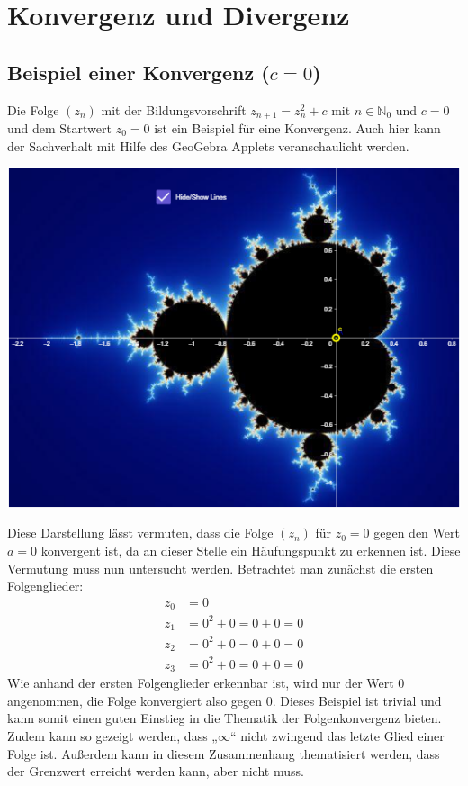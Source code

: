 \documentclass[a4paper, 12pt]{book}
\begin{document}
\sloppy

\chapter{Konvergenz und Divergenz}

\section{Beispiel einer Konvergenz ($c=0$)}

Die Folge \(\left( z_{n} \right)\) mit der Bildungsvorschrift
\(z_{n + 1} = z_{n}^{2} + c\) mit \(n \in \mathbb{N}_{0}\) und
\(c=0\) und dem Startwert \(z_{0} = 0\) ist ein Beispiel für
eine Konvergenz. Auch hier kann der Sachverhalt mit Hilfe des GeoGebra
Applets veranschaulicht werden.

\begin{center}
\includegraphics[width=0.5\linewidth]{image9.png}
\end{center}


Diese Darstellung lässt vermuten, dass die Folge
\(\left( z_{n} \right)\) für \(z_{0} = 0\) gegen den Wert
\(a = 0\) konvergent ist, da an dieser Stelle ein Häufungspunkt zu
erkennen ist. Diese Vermutung muss nun untersucht werden. Betrachtet man
zunächst die ersten Folgenglieder:
\begin{align*}
z_{0} &= 0 \\
z_{1} &= 0^{2} + 0 = 0 + 0 = 0\\
z_{2} &= 0^{2} + 0 = 0 + 0 = 0\\
z_{3} &= 0^{2} + 0 = 0 + 0 = 0
\end{align*}
Wie anhand der ersten Folgenglieder erkennbar ist, wird nur der Wert 0
angenommen, die Folge konvergiert also gegen 0. Dieses Beispiel ist
trivial und kann somit einen guten Einstieg in die Thematik der
Folgenkonvergenz bieten. Zudem kann so gezeigt werden, dass
„\(\infty\)`` nicht zwingend das letzte Glied einer Folge ist. Außerdem
kann in diesem Zusammenhang thematisiert werden, dass der Grenzwert
erreicht werden kann, aber nicht muss.
\end{document}

